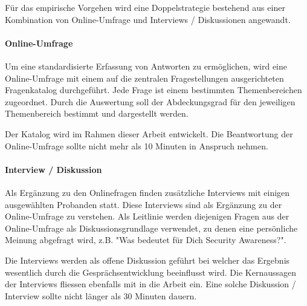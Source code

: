 \documentclass[../../main.tex]{subfiles}
\begin{document}
\begin{sloppypar}
Für das empirische Vorgehen wird eine Doppelstrategie bestehend aus einer Kombination von Online-Umfrage und Interviews / Diskussionen angewandt.
\end{sloppypar}

\paragraph*{Online-Umfrage}\mbox{}

\begin{sloppypar}
Um eine standardisierte Erfassung von Antworten zu ermöglichen, wird eine Online-Umfrage mit einem auf die zentralen Fragestellungen ausgerichteten Fragenkatalog durchgeführt. Jede Frage ist einem bestimmten Themenbereichen zugeordnet. Durch die Auswertung soll der Abdeckungsgrad für den jeweiligen Themenbereich bestimmt und dargestellt werden.

Der Katalog wird im Rahmen dieser Arbeit entwickelt. Die Beantwortung der Online-Umfrage sollte nicht mehr als 10 Minuten in Anspruch nehmen.
\end{sloppypar}

\paragraph*{Interview / Diskussion}\mbox{}

\begin{sloppypar}
Als Ergänzung zu den Onlinefragen finden zusätzliche Interviews mit einigen ausgewählten Probanden statt. Diese Interviews sind als Ergänzung zu der Online-Umfrage zu verstehen. Als Leitlinie werden diejenigen Fragen aus der Online-Umfrage als Diskussionsgrundlage verwendet, zu denen eine persönliche Meinung abgefragt wird, z.B. "Was bedeutet für Dich Security Awareness?".

Die Interviews werden als offene Diskussion geführt bei welcher das Ergebnis wesentlich durch die Gesprächsentwicklung beeinflusst wird. Die Kernaussagen der Interviews fliessen ebenfalls mit in die Arbeit ein. Eine solche Diskussion / Interview sollte nicht länger als 30 Minuten dauern.
\end{sloppypar}
\end{document}
